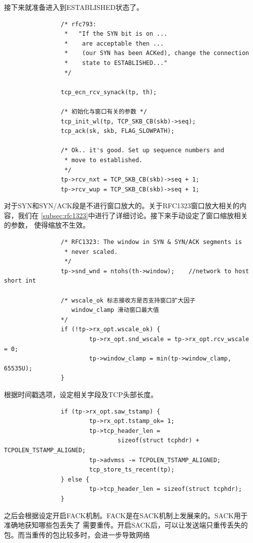 接下来就准备进入到ESTABLISHED状态了。
\begin{verbatim}
                /* rfc793:
                 *   "If the SYN bit is on ...
                 *    are acceptable then ...
                 *    (our SYN has been ACKed), change the connection
                 *    state to ESTABLISHED..."
                 */

                tcp_ecn_rcv_synack(tp, th);

                /* 初始化与窗口有关的参数 */
                tcp_init_wl(tp, TCP_SKB_CB(skb)->seq);
                tcp_ack(sk, skb, FLAG_SLOWPATH);

                /* Ok.. it's good. Set up sequence numbers and
                 * move to established.
                 */
                tp->rcv_nxt = TCP_SKB_CB(skb)->seq + 1;
                tp->rcv_wup = TCP_SKB_CB(skb)->seq + 1;
\end{verbatim}
对于SYN和SYN/ACK段是不进行窗口放大的。关于RFC1323窗口放大相关的内容，我们在
\ref{subsec:rfc1323}中进行了详细讨论。接下来手动设定了窗口缩放相关的参数，
使得缩放不生效。
\begin{verbatim}
                /* RFC1323: The window in SYN & SYN/ACK segments is
                 * never scaled.
                 */
                tp->snd_wnd = ntohs(th->window);    //network to host short int

                /* wscale_ok 标志接收方是否支持窗口扩大因子
                   window_clamp 滑动窗口最大值
                */                
                if (!tp->rx_opt.wscale_ok) {
                        tp->rx_opt.snd_wscale = tp->rx_opt.rcv_wscale = 0;
                        tp->window_clamp = min(tp->window_clamp, 65535U);
                }
\end{verbatim}
根据时间戳选项，设定相关字段及TCP头部长度。
\begin{verbatim}
                if (tp->rx_opt.saw_tstamp) {
                        tp->rx_opt.tstamp_ok= 1;
                        tp->tcp_header_len =
                                sizeof(struct tcphdr) + TCPOLEN_TSTAMP_ALIGNED;
                        tp->advmss -= TCPOLEN_TSTAMP_ALIGNED;
                        tcp_store_ts_recent(tp);
                } else {
                        tp->tcp_header_len = sizeof(struct tcphdr);
                }
\end{verbatim}
之后会根据设定开启FACK机制。FACK是在SACK机制上发展来的。SACK用于准确地获知哪些包丢失了
需要重传。开启SACK后，可以让发送端只重传丢失的包。而当重传的包比较多时，会进一步导致网络
